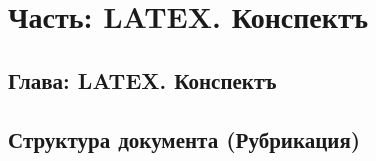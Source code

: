 





\tableofcontents

\part{Часть: LATEX. Конспектъ}
\chapter{Глава: LATEX. Конспектъ}




\chapter{Структура документа (Рубрикация)}








\appendix






